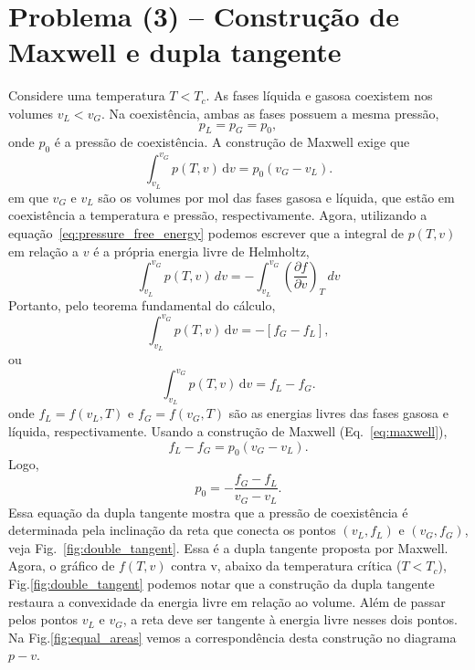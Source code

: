 \documentclass[11pt,a4paper]{article}
\renewcommand{\dd}{\mathrm{d}}
\begin{document}
\section*{Problema (3) -- Construção de Maxwell e dupla tangente}
%
Considere uma temperatura $T<T_c$. As fases líquida e gasosa coexistem nos volumes $v_L<v_G$. Na coexistência, ambas as fases possuem a mesma pressão,
%
\begin{equation}
    p_L=p_G=p_0,
\end{equation}
%
onde $p_0$ é a pressão de coexistência. A construção de Maxwell exige que
%
\begin{equation}    
    \int_{v_L}^{v_G}p(T,v)\,\dd v
    =
    p_0(v_G-v_L).
    \label{eq:maxwell}
\end{equation}
%
em que $v_G$ e $v_L$ são os volumes por mol das fases gasosa e líquida, que estão em coexistência a temperatura e pressão, respectivamente. Agora, utilizando a equação~\ref{eq:pressure_free_energy} podemos escrever que a integral de $p(T,v)$ em relação a $v$ é a própria energia livre de Helmholtz, 
%
\begin{equation}
   \int_{v_L}^{v_G} p(T,v)\, dv = - \int_{v_L}^{v_G} \left(\frac{\partial f}{\partial v}\right)_T\, dv
\end{equation}
%
Portanto, pelo teorema fundamental do cálculo, 
%
\begin{equation}
    \int_{v_L}^{v_G}p(T,v)\,\dd v
    =
    -[f_G-f_L],
\end{equation}
%
ou
%
\begin{equation}
    \int_{v_L}^{v_G}p(T,v)\,\dd v
    =
    f_L-f_G.
    \label{eq:intf}
\end{equation}
%
onde $f_L = f(v_L, T)$ e $f_G = f(v_G, T)$ são as energias livres das fases gasosa e líquida, respectivamente.
%
Usando a construção de Maxwell (Eq.~\ref{eq:maxwell}),
%
\begin{equation}
    f_L-f_G
    =
    p_0(v_G-v_L).
\end{equation}
%
Logo,
%
\begin{equation}
    \boxed{
    p_0
    =
    -\frac{f_G-f_L}{v_G-v_L}.
    }
    \label{eq:double_tangent}
\end{equation}
%
Essa equação da dupla tangente mostra que a pressão de coexistência
é determinada pela inclinação da reta que conecta os pontos
$(v_L,f_L)$ e $(v_G,f_G)$, veja Fig.~\ref{fig:double_tangent}. Essa é a dupla tangente proposta por Maxwell.
%
Agora, o gráfico de $f(T,v)$ contra v, abaixo da temperatura crítica ($T < T_c$), Fig.\ref{fig:double_tangent} podemos notar que a construção da dupla tangente restaura a convexidade da energia livre em relação ao volume. Além de passar pelos pontos $v_L$ e $v_G$, a reta deve ser tangente à energia livre nesses dois pontos. Na Fig.\ref{fig:equal_areas} vemos a correspondência desta construção no diagrama $p-v$.
\end{document}
